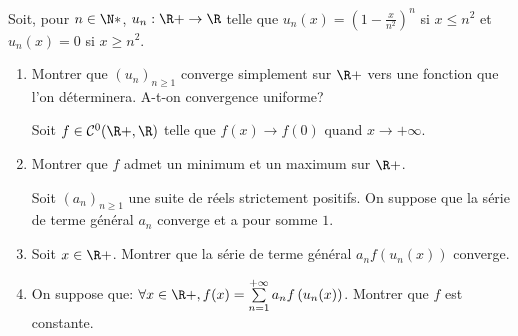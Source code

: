 \begin{enonce}
\begin{exercise}[ID={RMS 125 E377, 2014 XENS PSI},subtitle={2014 X-ENS PSI},tags={}]
Soit, pour $n\in\N*$, $u_n:\R+\to\R$ telle que
$u_n(x)=\left( 1-\frac{x}{n^2} \right)^n$ si $x\leq n^2$
et $u_n(x)=0$ si $x\geq n^2$.
\begin{enumerate}
  \item Montrer que $\left( u_n \right)_{n\geq 1}$ converge simplement sur $\R+$ vers une fonction que l'on déterminera.
    A-t-on convergence uniforme?

    Soit $f\in\mathcal{C}^0(\R+,\R)$ telle que $f(x)\to f(0)$ quand $x\to+\infty$.

  \item Montrer que $f$ admet un minimum et un maximum sur $\R+$.

    Soit $\left( a_n \right)_{n\geq1}$ une suite de réels strictement positifs.
    On suppose que la série de terme général $a_n$ converge et a pour somme $1$.

  \item Soit $x\in\R+$.
    Montrer que la série de terme général $a_n f\left( u_n(x) \right)$ converge.

  \item On suppose que: $\forall x\in\R+, f(x)=\sum\limits_{n=1}^{+\infty} a_n f\left( u_n(x) \right)$.
    Montrer que $f$ est constante.
\end{enumerate}
\end{exercise}
\begin{solution}
\end{solution}
\end{enonce}

